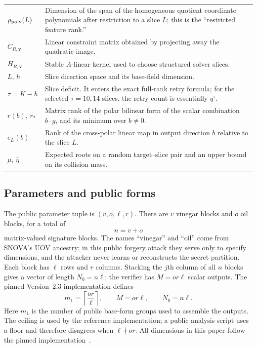 \documentclass[11pt]{article}
\begin{document}
\begin{table}[H]
\begin{tabularx}{0.96\textwidth}{@{}>{\raggedright\arraybackslash}p{}X@{}}
$\rho_{\rm poly}(L)$ & Dimension of the span of the homogeneous quotient
coordinate polynomials after restriction to a slice $L$; this is the
``restricted feature rank.''\\
$C_{R,\mathbf v}$ & Linear constraint matrix obtained by projecting away the quadratic
image.\\
$H_{R,\mathbf v}$ & Stable $A$-linear kernel used to choose structured solver slices.\\
$L$, $h$ & Slice direction space and its base-field dimension.\\
$\tau=K-h$ & Slice deficit.  It enters the exact full-rank retry formula;
for the selected $\tau=10,14$ slices, the retry count is essentially $q^\tau$.\\
$r(b)$, $r_*$ & Matrix rank of the polar bilinear form of the scalar
combination $b\cdot g$, and its minimum over $b\ne0$.\\
$e_L(b)$ & Rank of the cross-polar linear map in output direction $b$
relative to the slice $L$.\\
$\mu$, $\bar\eta$ & Expected roots on a random target--slice pair and an upper
bound on its collision mass.\\
\bottomrule
\end{tabularx}
\end{table}

\subsection{Parameters and public forms}\label{sec:parameters}

The public parameter tuple is $(v,o,\ell,r)$.  There are $v$ vinegar blocks and
$o$ oil blocks, for a total of
\[
  n=v+o
\]
matrix-valued signature blocks.  The names ``vinegar'' and ``oil'' come from
SNOVA's UOV ancestry; in this public forgery attack they serve only to specify
dimensions, and the attacker never learns or reconstructs the secret partition.
Each block has $\ell$ rows and $r$ columns.
Stacking the $j$th column of all $n$ blocks gives a vector of length
$N_0=n\ell$; the verifier has $M=or\ell$ scalar outputs.  The pinned
Version~2.3 implementation defines
\begin{equation}\label{eq:parameters-basic}
 m_1=\left\lceil\frac{or}{\ell}\right\rceil,
 \qquad M=or\ell,
 \qquad N_0=n\ell.
\end{equation}
Here $m_1$ is the number of public base-form groups used to assemble the
outputs.  The ceiling is used by the reference implementation; a public
analysis script uses a floor and therefore disagrees when $\ell\nmid or$.  All
dimensions in this paper follow the pinned implementation~\cite{SNOVA23}.
\end{document}
